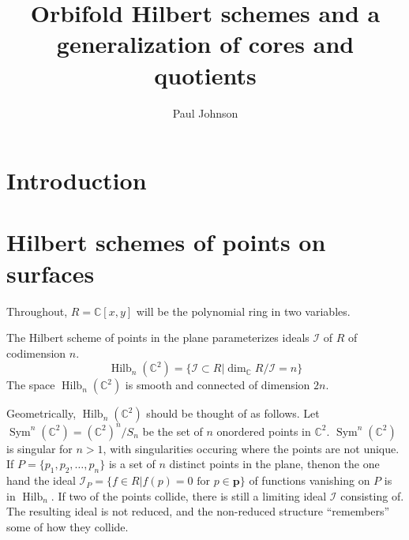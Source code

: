 \documentclass{amsart}[12pt]
\theoremstyle{definition}
\newcommand{\C}{\mathbb{C}}
\DeclareMathOperator{\Hilb}{Hilb}
\DeclareMathOperator{\Sym}{Sym}
\begin{document}
\title{Orbifold Hilbert schemes and a generalization of cores and quotients}


\author{Paul Johnson}
\address{University of Sheffield}


\maketitle

\section{Introduction}
\cite{GLMpower}

\section{Hilbert schemes of points on surfaces}

Throughout, $R=\C[x,y]$ will be the polynomial ring in two variables.  

The Hilbert scheme of points in the plane parameterizes ideals $\mathcal{I}$ of $R$ of codimension $n$.
$$\Hilb_n(\C^2)=\{\mathcal{I}\subset R | \dim_\C R/\mathcal{I}=n\}$$
The space $\Hilb_n(\C^2)$ is smooth and connected of dimension $2n$.

Geometrically, $\Hilb_n(\C^2)$ should be thought of as follows.  Let $\Sym^n(\C^2)=(\C^2)^n/S_n$ be the set of $n$ onordered points in $\C^2$.  $\Sym^n(\C^2)$ is singular for $n>1$, with singularities occuring where the points are not unique.  
If $P=\{p_1,p_2,\dots, p_n\}$ is a set of $n$ distinct points in the plane, thenon the one hand the ideal $\mathcal{I}_{P}=\{f\in R| f(p)=0 \text{ for }p\in \mathbf{p}\}$ of functions vanishing on $P$ is in $\Hilb_n$.  If two of the points collide, there is still a limiting ideal $\mathcal{I}$ consisting of.  The resulting ideal is not reduced, and the non-reduced structure ``remembers'' some of how they collide.
\end{document}
